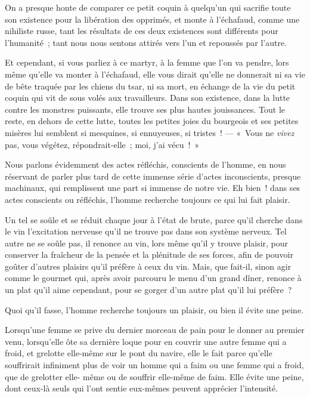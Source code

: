 \documentclass[french,twoside]{book} %
\begin{document}
\bigbreak
\noindent On a presque honte de comparer ce petit coquin à quelqu’un qui sacrifie toute son existence pour la libération des opprimés, et monte à l’échafaud, comme une nihiliste russe, tant les résultats de ces deux existences sont différents pour l’humanité ; tant nous nous sentons attirés vers l’un et repoussés par l’autre.\par
Et cependant, si vous parliez à ce martyr, à la femme que l’on va pendre, lors même qu’elle va monter à l’échafaud, elle vous dirait qu’elle ne donnerait ni sa vie de bête traquée par les chiens du tsar, ni sa mort, en échange de la vie du petit coquin qui vit de sous volés aux travailleurs. Dans son existence, dans la lutte contre les monstres puissants, elle trouve ses plus hautes jouissances. Tout le reste, en dehors de cette lutte, toutes les petites joies du bourgeois et ses petites misères lui semblent si mesquines, si ennuyeuses, si tristes ! — « Vous ne \emph{vivez} pas, vous végétez, répondrait-elle ; moi, j’ai vécu ! »\par
\bigbreak
\noindent Nous parlons évidemment des actes réfléchis, conscients de l’homme, en nous réservant de parler plus tard de cette immense série d’actes inconscients, presque machinaux, qui remplissent une part si immense de notre vie. Eh bien ! dans ses actes conscients ou réfléchis, l’homme recherche toujours ce qui lui fait plaisir.\par
Un tel se soûle et se réduit chaque jour à l’état de brute, parce qu’il cherche dans le vin l’excitation nerveuse qu’il ne trouve pas dans son système nerveux. Tel autre ne se soûle pas, il renonce au vin, lors même qu’il y trouve plaisir, pour conserver la fraîcheur de la pensée et la plénitude de ses forces, afin de pouvoir goûter d’autres plaisirs qu’il préfère à ceux du vin. Mais, que fait-il, sinon agir comme le gourmet qui, après avoir parcouru le menu d’un grand dîner, renonce à un plat qu’il aime cependant, pour se gorger d’un autre plat qu’il lui préfère ?\par
Quoi qu’il fasse, l’homme recherche toujours un plaisir, ou bien il évite une peine.\par
Lorsqu’une femme se prive du dernier morceau de pain pour le donner au premier venu, lorsqu’elle ôte sa dernière loque pour en couvrir une autre femme qui a froid, et grelotte elle-même sur le pont du navire, elle le fait parce qu’elle souffrirait infiniment plus de voir un homme qui a faim ou une femme qui a froid, que de grelotter elle- même ou de souffrir elle-même de faim. Elle évite une peine, dont ceux-là seuls qui l’ont sentie eux-mêmes peuvent apprécier l’intensité.\par
\end{document}
